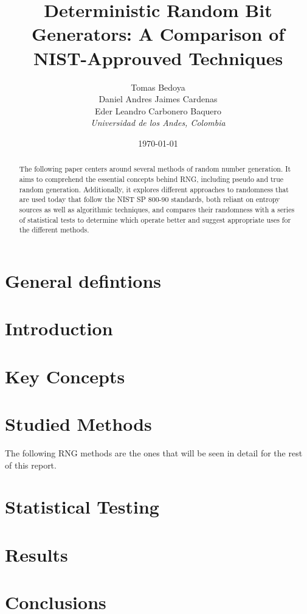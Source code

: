 \documentclass[conference]{IEEEtran}
\title{Deterministic Random Bit Generators: A Comparison of NIST-Approuved Techniques}
\author{
    Tomas Bedoya \\
    Daniel Andres Jaimes Cardenas \\
    Eder Leandro Carbonero Baquero \\
    \textit{Universidad de los Andes, Colombia}
}
\date{\today}
\begin{document}
\maketitle
\begin{abstract}
The following paper centers around several methods of random number generation. It aims to comprehend the essential concepts behind RNG, including pseudo and true random generation. Additionally, it explores different approaches to randomness that are used today that follow the NIST SP 800-90 standards, both reliant on entropy sources as well as algorithmic techniques, and compares their randomness with a series of statistical tests to determine which operate better and suggest appropriate uses for the different methods.

\end{abstract}

\section*{General defintions}


\section{Introduction}


\section{Key Concepts}


\section{Studied Methods}
The following RNG methods are the ones that will be seen in detail for the rest of this report.


\section{Statistical Testing}


\section{Results}


\section{Conclusions}

\end{document}
